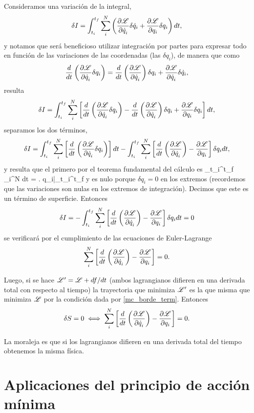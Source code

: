 \documentclass[10pt,oneside]{CBFT_book}
\begin{document}
Consideramos una variación de la integral,
\[
	\delta I =  \int_{t_i}^{t_f} \sum_i^N \left( \dpar{\Lag}{\dot{q}_i} \delta \dot{q}_i +
	\dpar{\Lag}{q_i} \delta q_i  \right) dt,
\]
y notamos que será beneficioso utilizar integración por partes para expresar todo en función de
las variaciones de las coordenadas (las $\delta q_i$), de manera que como
\[
	\frac{d}{dt}\left( \dpar{\Lag}{\dot{q}_i} \delta q_i \right) =
	\frac{d}{dt}\left( \dpar{\Lag}{\dot{q}_i} \right) \delta q_i + \dpar{\Lag}{\dot{q}_i}\delta \dot{q}_i,
\]
resulta
\[
	\delta I =  \int_{t_i}^{t_f} \sum_i^N \left[ \frac{d}{dt}\left( \dpar{\Lag}{\dot{q}_i} \delta q_i \right) -
	\frac{d}{dt}\left( \dpar{\Lag}{\dot{q}_i} \right) \delta q_i + \dpar{\Lag}{q_i} \delta q_i  \right] dt,
\]
separamos los dos términos,
\[
	\delta I =  \int_{t_i}^{t_f} \sum_i^N \left[ \frac{d}{dt}\left( \dpar{\Lag}{\dot{q}_i} \delta q_i \right) 
	\right] dt - \int_{t_i}^{t_f} \sum_i^N \left[ \frac{d}{dt}\left( \dpar{\Lag}{\dot{q}_i} \right) - 
	\dpar{\Lag}{q_i} \right]  \delta q_i  dt,
\]
y resulta que el primero por el teorema fundamental del cálculo es
\be
	\int_{t_i}^{t_f} \sum_i^N  dt =
	\left.  \delta q_i\right|_{t_i}^{t_f}
\label{mc_borde_term}
\ee
y es nulo porque $\delta q_i=0$ en los extremos (recordemos que las variaciones son nulas en los extremos de
integración). Decimos que este es un término de superficie.
Entonces
\[
	\delta I =  -\int_{t_i}^{t_f} \sum_i^N \left[ \frac{d}{dt}\left( \dpar{\Lag}{\dot{q}_i} \right)
	- \dpar{\Lag}{q_i} \right]  \delta q_i  dt = 0
\]
se verificará por el cumplimiento de las ecuaciones de Euler-Lagrange
\[
	\sum_i^N  \left[ \frac{d}{dt}\left( \dpar{\Lag}{\dot{q}_i} \right) - \dpar{\Lag}{q_i} \right] = 0.
\]

Luego, si se hace $\Lag' = \Lag + df/dt$ (ambos lagrangianos difieren en una derivada total con 
respecto al tiempo) la trayectoria que minimiza $\Lag'$ es la que misma que minimiza
$\Lag$ por la condición dada por \eqref{mc_borde_term}. Entonces 
\[
	\delta S = 0 \iff \sum_i^N  \left[ \frac{d}{dt}\left( \dpar{\Lag}{\dot{q}_i} \right) -
	\dpar{\Lag}{q_i} \right] = 0.
\]

La moraleja es que si los lagrangianos difieren en una derivada total del tiempo obtenemos la misma
física.

\section{Aplicaciones del principio de acción mínima}
\end{document}
